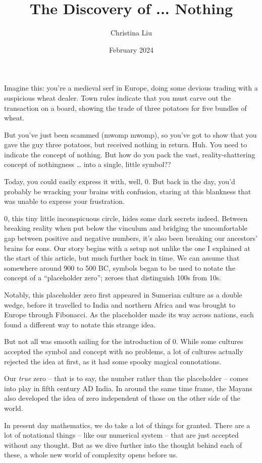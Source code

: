 \documentclass{article}
\title{The Discovery of ... Nothing}
\author{Christina Liu}
\date{February 2024}
\begin{document}
\maketitle

Imagine this: you’re a medieval serf in Europe, doing some devious trading with a suspicious wheat dealer. Town rules indicate that you must carve out the transaction on a board, showing the trade of three potatoes for five bundles of wheat.

But you’ve just been scammed (mwomp mwomp), so you’ve got to show that you gave the guy three potatoes, but received nothing in return.
Huh. You need to indicate the concept of nothing. But how do you pack the vast, reality-shattering concept of nothingness … into a single, little symbol??

Today, you could easily express it with, well, 0. But back in the day, you’d probably be wracking your brains with confusion, staring at this blankness that was unable to express your frustration.

0, this tiny little inconspicuous circle, hides some dark secrets indeed. Between breaking reality when put below the vinculum and bridging the uncomfortable gap between positive and negative numbers, it’s also been breaking our ancestors’ brains for eons.
Our story begins with a setup not unlike the one I explained at the start of this article, but much further back in time. We can assume that somewhere around  900 to 500 BC, symbols began to be used to notate the concept of a “placeholder zero”; zeroes that distinguish 100s from 10s.

Notably, this placeholder zero first appeared in Sumerian culture as a double wedge, before it travelled to India and northern Africa and was brought to Europe through Fibonacci. As the placeholder made its way across nations, each found a different way to notate this strange idea.

But not all was smooth sailing for the introduction of 0. While some cultures accepted the symbol and concept with no problems, a lot of cultures actually rejected the idea at first, as it had some spooky magical connotations.

Our \textit{true} zero – that is to say, the number rather than the placeholder – comes into play in fifth century AD India. In around the same time frame, the Mayans also developed the idea of zero independent of those on the other side of the world.

In present day mathematics, we do take a lot of things for granted. There are a lot of notational things – like our numerical system – that are just accepted without any thought. But as we dive further into the thought behind each of these, a whole new world of complexity opens before us.
\end{document}
